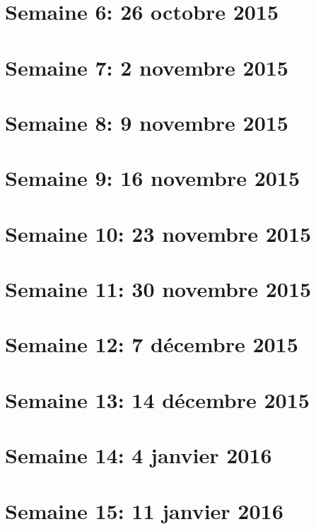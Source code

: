 \documentclass[11pt,a4paper,oldfontcommands]{memoir}
\begin{document}
\section{Semaine 6: 26 octobre 2015}

\section{Semaine 7: 2 novembre 2015}

\section{Semaine 8: 9 novembre 2015}

\section{Semaine 9: 16 novembre 2015}

\section{Semaine 10: 23 novembre 2015}

\section{Semaine 11: 30 novembre 2015}

\section{Semaine 12: 7 décembre 2015}

\section{Semaine 13: 14 décembre 2015}

\section{Semaine 14: 4 janvier 2016}

\section{Semaine 15: 11 janvier 2016}

\end{document}
